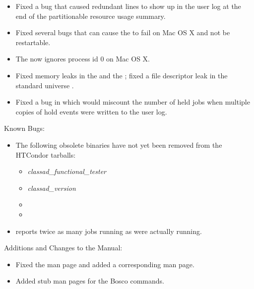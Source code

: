\begin{itemize}
\item Fixed a bug that caused redundant lines to show up in the user log
at the end of the partitionable resource usage summary.

\item Fixed several bugs that can cause the  to fail on Mac OS X
and not be restartable.

\item The  now ignores process id 0 on Mac OS X.

\item Fixed memory leaks in the  and the ;
fixed a file descriptor leak in the standard universe .

\item Fixed a bug in which  would miscount the number
of held jobs when
multiple copies of hold events were written to the user log.

\end{itemize}

\noindent Known Bugs:

\begin{itemize}

\item The following obsolete binaries have not yet been removed from
the HTCondor tarballs:  
  \begin{itemize}
  \item \emph{classad\_functional\_tester}
  \item \emph{classad\_version}
  \item {}
  \item {}
  \end{itemize}

\item {}  reports twice
as many jobs running as were actually running.

\end{itemize}

\noindent Additions and Changes to the Manual:

\begin{itemize}

\item Fixed the  man page and added a corresponding
 man page.

\item Added stub man pages for the Bosco commands.

\end{itemize}


